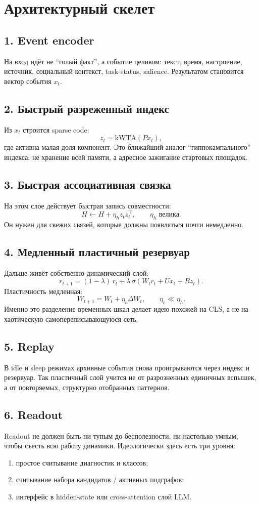 \section{Архитектурный скелет}

\subsection*{1. Event encoder}
На вход идёт не ``голый факт'', а событие целиком: текст, время, настроение, источник,
социальный контекст, task-status, salience. Результатом становится вектор события $x_t$.

\subsection*{2. Быстрый разреженный индекс}
Из $x_t$ строится sparse code:
\[
z_t = \mathrm{kWTA}(Px_t),
\]
где активна малая доля компонент. Это ближайший аналог ``гиппокампального'' индекса:
не хранение всей памяти, а адресное зажигание стартовых площадок.

\subsection*{3. Быстрая ассоциативная связка}
На этом слое действует быстрая запись совместности:
\[
H \leftarrow H + \eta_h z_t z_t^\top,
\qquad \eta_h \text{ велика}.
\]
Он нужен для свежих связей, которые должны появляться почти немедленно.

\subsection*{4. Медленный пластичный резервуар}
Дальше живёт собственно динамический слой:
\[
r_{t+1}
=(1-\lambda)\,r_t + \lambda\,\sigma(W_t r_t + Ux_t + Bz_t).
\]
Пластичность медленная:
\[
W_{t+1}=W_t+\eta_c \Delta W_t,
\qquad \eta_c \ll \eta_h.
\]
Именно это разделение временных шкал делает идею похожей на CLS, а не на хаотическую
самопереписывающуюся сеть.

\subsection*{5. Replay}
В idle и sleep режимах архивные события снова проигрываются через индекс и резервуар.
Так пластичный слой учится не от разрозненных единичных вспышек, а от повторяемых,
структурно отобранных паттернов.

\subsection*{6. Readout}
Readout не должен быть ни тупым до бесполезности, ни настолько умным, чтобы съесть
всю работу динамики. Идеологически здесь есть три уровня:
\begin{enumerate}
\item простое считывание диагностик и классов;
\item считывание набора кандидатов / активных подграфов;
\item интерфейс в hidden-state или cross-attention слой LLM.
\end{enumerate}

